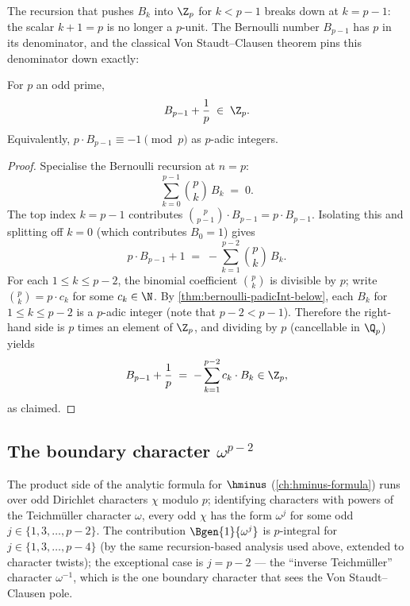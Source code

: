 The recursion that pushes $B_k$ into $\Z_p$ for $k < p - 1$ breaks
down at $k = p - 1$: the scalar $k + 1 = p$ is no longer a $p$-unit.
The Bernoulli number $B_{p-1}$ has $p$ in its denominator, and the
classical Von Staudt--Clausen theorem pins this denominator down
exactly:

\begin{theorem}[Von Staudt--Clausen, $p$-local form at $n = p - 1$]
  \label{thm:von-staudt-clausen}
  \leanok
For $p$ an odd prime,
\[
  B_{p-1} + \frac{1}{p} \;\in\; \Z_p.
\]
Equivalently, $p \cdot B_{p-1} \equiv -1 \pmod{p}$ as $p$-adic
integers.
\end{theorem}

\begin{proof}\leanok
Specialise the Bernoulli recursion at $n = p$:
\[
  \sum_{k = 0}^{p - 1} \binom{p}{k}\,B_k \;=\; 0.
\]
The top index $k = p - 1$ contributes $\binom{p}{p - 1} \cdot B_{p-1}
= p \cdot B_{p-1}$. Isolating this and splitting off $k = 0$
(which contributes $B_0 = 1$) gives
\[
  p \cdot B_{p-1} + 1
  \;=\; -\sum_{k = 1}^{p - 2} \binom{p}{k}\,B_k.
\]
For each \(1 \le k \le p - 2\), the binomial coefficient
\(\binom{p}{k}\) is divisible by \(p\); write
$\binom{p}{k} = p \cdot c_k$ for some $c_k \in \N$. By
\cref{thm:bernoulli-padicInt-below}, each $B_k$ for $1 \le k \le p - 2$
is a $p$-adic integer (note that $p - 2 < p - 1$). Therefore the
right-hand side is $p$ times an element of $\Z_p$, and dividing by
$p$ (cancellable in $\Q_p$) yields
\[
  B_{p - 1} + \frac{1}{p} \;=\; -\sum_{k=1}^{p-2} c_k \cdot B_k \in \Z_p,
\]
as claimed.
\end{proof}

\subsection*{The boundary character $\omega^{p-2}$}

The product side of the analytic formula for $\hminus$
(\cref{ch:hminus-formula}) runs over odd Dirichlet characters $\chi$
modulo $p$; identifying characters with powers of the Teichm\"uller
character $\omega$, every odd $\chi$ has the form $\omega^j$ for some
odd $j \in \{1, 3, \dots, p - 2\}$. The contribution
$\Bgen{1}{\omega^j}$ is $p$-integral for $j \in \{1, 3, \dots, p - 4\}$
(by the same recursion-based analysis used above, extended to
character twists); the exceptional case is $j = p - 2$ — the
``inverse Teichm\"uller'' character $\omega^{-1}$, which is the one
boundary character that sees the Von Staudt--Clausen pole.

